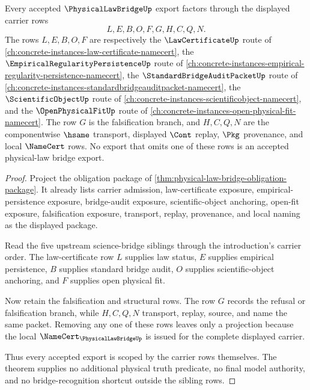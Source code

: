 \begin{theorem}
\label{thm:physical-law-bridge-scope-export}
Every accepted $\PhysicalLawBridgeUp$ export factors through the displayed carrier rows
$$
L,E,B,O,F,G,H,C,Q,N .
$$
The rows $L,E,B,O,F$ are respectively the $\LawCertificateUp$ route of \autoref{ch:concrete-instances-law-certificate-namecert}, the $\EmpiricalRegularityPersistenceUp$ route of \autoref{ch:concrete-instances-empirical-regularity-persistence-namecert}, the $\StandardBridgeAuditPacketUp$ route of \autoref{ch:concrete-instances-standardbridgeauditpacket-namecert}, the $\ScientificObjectUp$ route of \autoref{ch:concrete-instances-scientificobject-namecert}, and the $\OpenPhysicalFitUp$ route of \autoref{ch:concrete-instances-open-physical-fit-namecert}. The row $G$ is the falsification branch, and $H,C,Q,N$ are the componentwise $\hsame$ transport, displayed $\Cont$ replay, $\Pkg$ provenance, and local $\NameCert$ rows. No export that omits one of these rows is an accepted physical-law bridge export.
\end{theorem}
\begin{proof}
Project the obligation package of \autoref{thm:physical-law-bridge-obligation-package}. It already lists carrier admission, law-certificate exposure, empirical-persistence exposure, bridge-audit exposure, scientific-object anchoring, open-fit exposure, falsification exposure, transport, replay, provenance, and local naming as the displayed package.

Read the five upstream science-bridge siblings through the introduction's carrier order. The law-certificate row $L$ supplies law status, $E$ supplies empirical persistence, $B$ supplies standard bridge audit, $O$ supplies scientific-object anchoring, and $F$ supplies open physical fit.

Now retain the falsification and structural rows. The row $G$ records the refusal or falsification branch, while $H,C,Q,N$ transport, replay, source, and name the same packet. Removing any one of these rows leaves only a projection because the local $\NameCert_{\PhysicalLawBridgeUp}$ is issued for the complete displayed carrier.

Thus every accepted export is scoped by the carrier rows themselves. The theorem supplies no additional physical truth predicate, no final model authority, and no bridge-recognition shortcut outside the sibling rows.
\end{proof}

